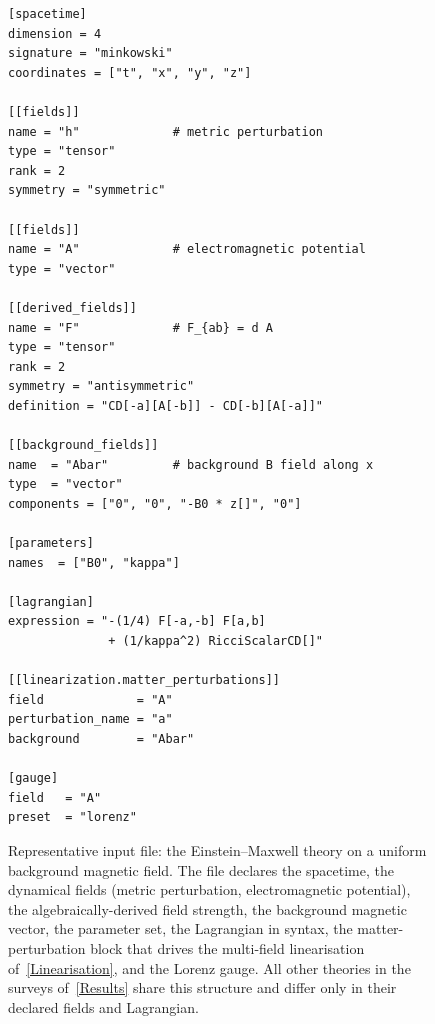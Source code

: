 \begin{figure}[t]
\begin{lstlisting}[frame=single,keepspaces=true,basicstyle=\footnotesize\ttfamily]
[spacetime]
dimension = 4
signature = "minkowski"
coordinates = ["t", "x", "y", "z"]

[[fields]]
name = "h"             # metric perturbation
type = "tensor"
rank = 2
symmetry = "symmetric"

[[fields]]
name = "A"             # electromagnetic potential
type = "vector"

[[derived_fields]]
name = "F"             # F_{ab} = d A
type = "tensor"
rank = 2
symmetry = "antisymmetric"
definition = "CD[-a][A[-b]] - CD[-b][A[-a]]"

[[background_fields]]
name  = "Abar"         # background B field along x
type  = "vector"
components = ["0", "0", "-B0 * z[]", "0"]

[parameters]
names  = ["B0", "kappa"]

[lagrangian]
expression = "-(1/4) F[-a,-b] F[a,b]
              + (1/kappa^2) RicciScalarCD[]"

[[linearization.matter_perturbations]]
field             = "A"
perturbation_name = "a"
background        = "Abar"

[gauge]
field   = "A"
preset  = "lorenz"
\end{lstlisting}
\caption{Representative \TIDAL{} input file: the Einstein--Maxwell
theory on a uniform background magnetic field. The file declares the
spacetime, the dynamical fields (metric perturbation, electromagnetic
potential), the algebraically-derived field strength, the background
magnetic vector, the parameter set, the Lagrangian in \xAct{} syntax,
the matter-perturbation block that drives the multi-field linearisation
of~\cref{Linearisation}, and the Lorenz gauge. All other theories
in the surveys of~\cref{Results} share this structure and differ only
in their declared fields and Lagrangian.}
\label{TOMLExample}
\end{figure}

